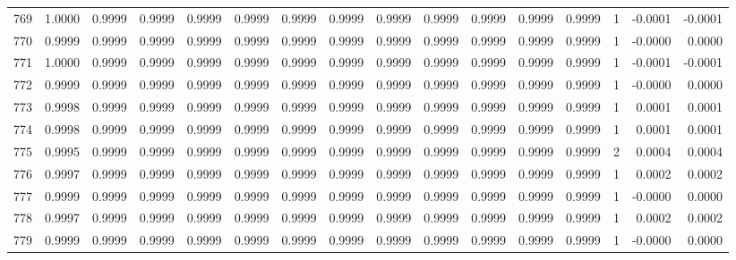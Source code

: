 \begin{tabular}{lrrrrrrrrrrrrrrr}
769 &      1.0000 &  0.9999 &  0.9999 &  0.9999 &  0.9999 &  0.9999 &  0.9999 &  0.9999 &  0.9999 &  0.9999 &   0.9999 &     0.9999 &      1 &                   -0.0001 &                    -0.0001 \\
770 &      0.9999 &  0.9999 &  0.9999 &  0.9999 &  0.9999 &  0.9999 &  0.9999 &  0.9999 &  0.9999 &  0.9999 &   0.9999 &     0.9999 &      1 &                   -0.0000 &                     0.0000 \\
771 &      1.0000 &  0.9999 &  0.9999 &  0.9999 &  0.9999 &  0.9999 &  0.9999 &  0.9999 &  0.9999 &  0.9999 &   0.9999 &     0.9999 &      1 &                   -0.0001 &                    -0.0001 \\
772 &      0.9999 &  0.9999 &  0.9999 &  0.9999 &  0.9999 &  0.9999 &  0.9999 &  0.9999 &  0.9999 &  0.9999 &   0.9999 &     0.9999 &      1 &                   -0.0000 &                     0.0000 \\
773 &      0.9998 &  0.9999 &  0.9999 &  0.9999 &  0.9999 &  0.9999 &  0.9999 &  0.9999 &  0.9999 &  0.9999 &   0.9999 &     0.9999 &      1 &                    0.0001 &                     0.0001 \\
774 &      0.9998 &  0.9999 &  0.9999 &  0.9999 &  0.9999 &  0.9999 &  0.9999 &  0.9999 &  0.9999 &  0.9999 &   0.9999 &     0.9999 &      1 &                    0.0001 &                     0.0001 \\
775 &      0.9995 &  0.9999 &  0.9999 &  0.9999 &  0.9999 &  0.9999 &  0.9999 &  0.9999 &  0.9999 &  0.9999 &   0.9999 &     0.9999 &      2 &                    0.0004 &                     0.0004 \\
776 &      0.9997 &  0.9999 &  0.9999 &  0.9999 &  0.9999 &  0.9999 &  0.9999 &  0.9999 &  0.9999 &  0.9999 &   0.9999 &     0.9999 &      1 &                    0.0002 &                     0.0002 \\
777 &      0.9999 &  0.9999 &  0.9999 &  0.9999 &  0.9999 &  0.9999 &  0.9999 &  0.9999 &  0.9999 &  0.9999 &   0.9999 &     0.9999 &      1 &                   -0.0000 &                     0.0000 \\
778 &      0.9997 &  0.9999 &  0.9999 &  0.9999 &  0.9999 &  0.9999 &  0.9999 &  0.9999 &  0.9999 &  0.9999 &   0.9999 &     0.9999 &      1 &                    0.0002 &                     0.0002 \\
779 &      0.9999 &  0.9999 &  0.9999 &  0.9999 &  0.9999 &  0.9999 &  0.9999 &  0.9999 &  0.9999 &  0.9999 &   0.9999 &     0.9999 &      1 &                   -0.0000 &                     0.0000 \\

\end{tabular}
